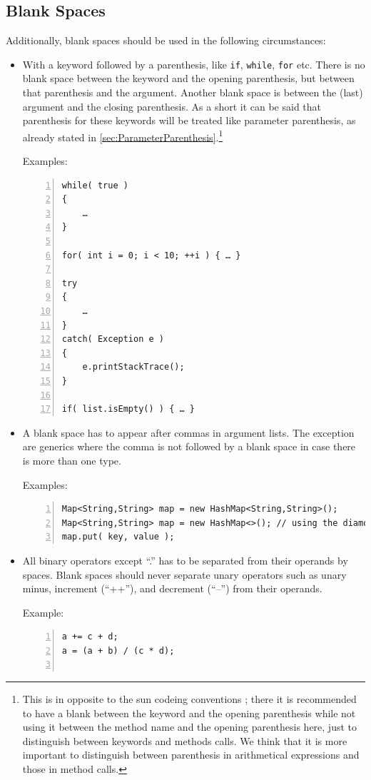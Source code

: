\documentclass[12pt,a4paper,titlepage, parskip=half, headsepline, footsepline, cleardoubleplain]{scrbook}
\begin{document}
\subsection{Blank Spaces}\label{sec:BlankSpaces}
Additionally, blank spaces should be used in the following circumstances:
\begin{itemize}
\item{With a keyword followed by a parenthesis, like \lstinline|if|, \lstinline|while|, \lstinline|for| etc. There is no blank space between the keyword and the opening parenthesis, but  between that parenthesis and the argument. Another blank space is between the (last) argument and the closing parenthesis. As a short it can be said that parenthesis for these keywords will be treated like parameter parenthesis, as already stated in \ref{sec:ParameterParenthesis}.\footnote{This is in opposite to the sun codeing conventions \autocite{SUN_CODE_CONVENTIONS}; there it is recommended to have a blank between the keyword and the opening parenthesis while not using it between the method name and the opening parenthesis here, just to distinguish between keywords and methods calls. We think that it is more important to distinguish between parenthesis in arithmetical expressions and those in method calls.}

Examples:
\begin{lstlisting}[numbers=left]
while( true )
{
    …
}

for( int i = 0; i < 10; ++i ) { … }

try
{
    …
}
catch( Exception e )
{
    e.printStackTrace();
}

if( list.isEmpty() ) { … }
\end{lstlisting}}
\item{A blank space has to appear after commas in argument lists. The exception are generics where the comma is not followed by a blank space in case there is more than one type.

Examples:
\begin{lstlisting}[numbers=left]
Map<String,String> map = new HashMap<String,String>();
Map<String,String> map = new HashMap<>(); // using the diamond operator
map.put( key, value );
\end{lstlisting}}
\item{All binary operators except “.” has to be separated from their operands by spaces. Blank spaces should never separate unary operators such as unary minus, increment (“++”), and decrement (“--”) from their operands.

Example:
\begin{lstlisting}[numbers=left]
a += c + d;
a = (a + b) / (c * d);


\end{lstlisting}}
\end{itemize}
\end{document}
